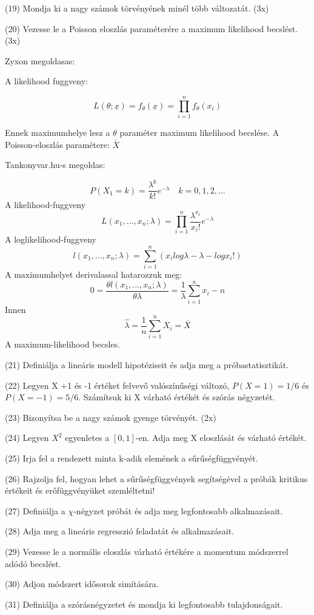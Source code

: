 \documentclass[12p]{article}
\begin{document}
(19) Mondja ki a nagy számok törvényének minél több változatát. (3x)

(20) Vezesse le a Poisson eloszlás paraméterére a maximum likelihood becslést. (3x)

Zyxon megoldasas:

A likelihood fuggveny:

$$L(\theta;\underline{x}) = f_{\theta}(\underline{x}) = \prod^n_{i=1} f_{\theta}(x_i)$$

Ennek maximumhelye lesz a $\theta$ paraméter maximum likelihood becslése. A Poisson-eloszlás paramétere: $\overline{X}$

Tankonyvar.hu-s megoldas:

$$P(X_1 = k) = \frac{\lambda^k}{k!}e^{-\lambda}\quad k=0, 1, 2, ...$$
A likelihood-fuggveny
$$L(x_1, ..., x_n;\lambda)=\prod^n_{i=1}\frac{\lambda^{x_i}}{x_i!}e^{-\lambda}$$
A loglikelihood-fuggveny
$$l(x_1, ..., x_n;\lambda) = \sum^n_{i=1}(x_i log \lambda - \lambda - log x_i!)$$
A maximumhelyet derivalassal hatarozzuk meg:
$$0 = \frac{\theta l(x_1, ..., x_n;\lambda)}{\theta \lambda} = \frac{1}{\lambda} \sum^n_{i=1} x_i - n$$
Innen
$$\hat{\lambda} = \frac{1}{n} \sum^n_{i=1} X_i = \overline{X}$$
A maximum-likelihood becsles.

(21) Definiálja a lineáris modell hipotéziseit és adja meg a próbastatisztikát.

(22) Legyen X +1 és -1 értéket felvevő valószínűségi változó, $P(X = 1) = 1/6$ és $P(X = -1) = 5/6$. Számítsuk ki X várható értékét és szórás négyzetét.

(23) Bizonyítsa be a nagy számok gyenge törvényét. (2x)

(24) Legyen $X^2$ egyenletes a $[0, 1]$-en. Adja meg X eloszlását és várható értékét.

(25) Irja fel a rendezett minta k-adik elemének a sűrűségfüggvényét.

(26) Rajzolja fel, hogyan lehet a sűrűségfüggvények segítségével a próbák kritikus értékeit és erőfüggvényüket szemléltetni!

(27) Definiálja a $\chi$-négyzet próbát és adja meg legfontosabb alkalmazásait.

(28) Adja meg a lineáris regresszió feladatát és alkalmazásait.

(29) Vezesse le a normális eloszlás várható értékére a momentum módszerrel adódó becslést.

(30) Adjon módszert idősorok simítására.

(31) Definiálja a szórásnégyzetet és mondja ki legfontosabb tulajdonságait.
\end{document}
